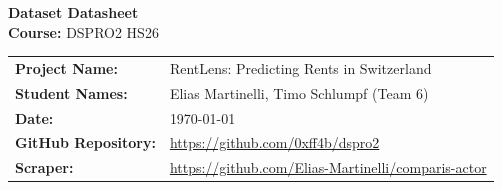 \documentclass[11pt, a4paper]{article}
\begin{document}
\begin{center}
    {\huge \bfseries \color{primaryBlue} Dataset Datasheet} \\[0.2cm]
    {\large \textbf{Course:} DSPRO2 HS26} \\[0.1cm]
\end{center}

\vspace{0.4cm}

\begin{studentbox}
    \begin{tabularx}{\textwidth}{l X}
        \textbf{Project Name:} & RentLens: Predicting Rents in Switzerland \\
        \textbf{Student Names:} & Elias Martinelli, Timo Schlumpf (Team 6) \\
        \textbf{Date:} & \today \\
        \textbf{GitHub Repository:} & \url{https://github.com/0xff4b/dspro2} \\
        \textbf{Scraper:} & \url{https://github.com/Elias-Martinelli/comparis-actor} \\
    \end{tabularx}
\end{studentbox}

\vspace{0.5cm}

\end{document}
